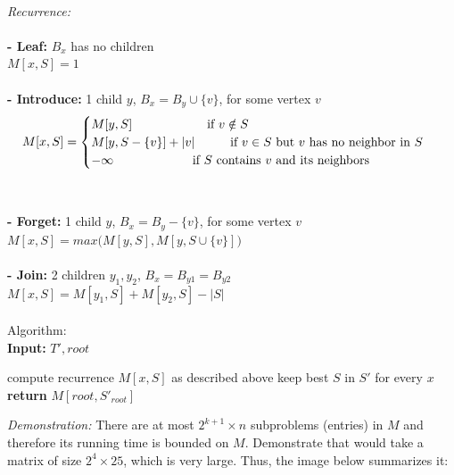 \documentclass{article}
\newcommand\tab[1][1cm]{\hspace*{#1}}
\begin{document}
\\
\textit{Recurrence:}
\\
\\
\textbf{- Leaf:} $B_x$ has no children
\\
$M[x, S] = 1$
\\
\\
\textbf{- Introduce:} 1 child $y$, $B_x = B_y \cup \{v\}$, for some vertex $v$
\begin{gather*}
M[x, S] =
\begin{cases}
M[y, S] \tab\tab\text{ if $v \notin S$ } \\
M[y, S - \{v\}] + |v| \tab\text{if $v \in S$ but $v$ has no neighbor in $S$ }\\
-\infty \tab\tab\text{   }\text{ if $S$ contains $v$ and its neighbors }
\end{cases}
\end{gather*}\\
\\
\textbf{- Forget:} 1 child $y$, $B_x = B_y - \{v\}$, for some vertex $v$
\\
$M[x, S] = max\big(M[y, S], M[y, S \cup \{v\}]\big)$
\\
\\
\textbf{- Join:} 2 children $y_1, y_2$, $B_x = B_{y1} = B_{y2}$
\\
$M[x, S] = M[y_1, S] + M[y_2, S] - |S|$
\\
\\
Algorithm:\\
\textbf{Input:} $T', root$
\begin{algorithmic}
    \State compute recurrence $M[x, S]$ as described above
    \State keep best $S$ in $S'$ for every $x$
  \EndFor
\EndFor
\State \textbf{return} $M[root, S'_{root}]$\\
\end{algorithmic}
\textit{Demonstration:}
There are at most $2^{k+1}\times n$ subproblems (entries) in $M$ and therefore its running time is bounded on $M$. Demonstrate that would take a matrix of size $2^4 \times 25$, which is very large. Thus, the image below summarizes it:
\end{document}
